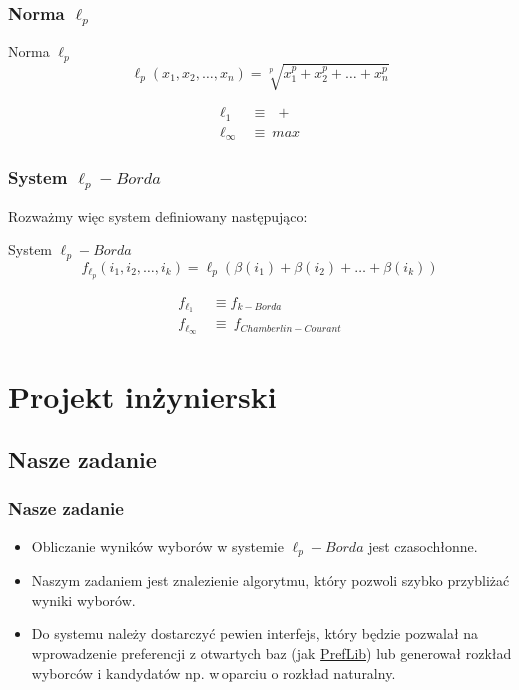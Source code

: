 \documentclass{beamer}
\begin{document}

\begin{frame}
\frametitle{Norma $\ell_p$}

\begin{block}{Norma $\ell_p$}
$$
\ell_p(x_1, x_2, \ldots, x_n ) = \sqrt[p]{ x_1^p + x_2^p + \ldots + x_n^p }
$$
\end{block}

\begin{exampleblock}{}
$$
\begin{aligned}
\ell_1 	\	 &\equiv 	\ \ +  \\
\ell_\infty 	\  &\equiv 	\ max 
\end{aligned}
$$
\end{exampleblock}

\end{frame}


\begin{frame}
\frametitle{System $\ell_p-Borda$}

Rozważmy więc system definiowany następująco:

\begin{exampleblock}{System $\ell_p-Borda$}
$$
f_{\ell_p}(i_1, i_2, \ldots, i_k ) = \ell_p( \beta(i_1) + \beta(i_2) + \ldots + \beta(i_k) )
$$
\end{exampleblock}

\begin{exampleblock}{}
$$
\begin{aligned}
f_{\ell_1} 	\	 &\equiv 	f_{k-Borda}  \\
f_{\ell_\infty} 	\  &\equiv 	\ f_{Chamberlin-Courant} 
\end{aligned}
$$
\end{exampleblock}

\end{frame}

\section{Projekt inżynierski}

\subsection{Nasze zadanie}

\begin{frame}
\frametitle{Nasze zadanie}
\begin{itemize}
\item Obliczanie wyników wyborów w systemie $\ell_p-Borda$ jest czasochłonne.
\item Naszym zadaniem jest znalezienie algorytmu, który pozwoli szybko przybliżać wyniki wyborów.
\item Do systemu należy dostarczyć pewien interfejs, który będzie pozwalał na wprowadzenie preferencji z otwartych baz (jak \href{http://www.preflib.org/}{PrefLib}) lub generował rozkład wyborców i kandydatów np. w\,oparciu o rozkład naturalny.
\end{itemize}
\end{frame}
\end{document}
